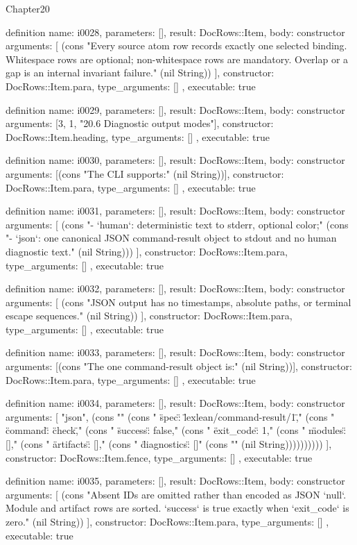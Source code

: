 \begin{lexlean}{Chapter20}
\begin{semanticmodule}
definition{
  name: i0028,
  parameters: [],
  result: DocRows::Item,
  body: constructor{
    arguments: [
      (cons "Every source atom row records exactly one selected binding. Whitespace rows are optional; non-whitespace rows are mandatory. Overlap or a gap is an internal invariant failure." (nil String))
    ],
    constructor: DocRows::Item.para,
    type_arguments: []
  },
  executable: true
}

definition{
  name: i0029,
  parameters: [],
  result: DocRows::Item,
  body: constructor{
    arguments: [3, 1, "20.6 Diagnostic output modes"],
    constructor: DocRows::Item.heading,
    type_arguments: []
  },
  executable: true
}

definition{
  name: i0030,
  parameters: [],
  result: DocRows::Item,
  body: constructor{
    arguments: [(cons "The CLI supports:" (nil String))],
    constructor: DocRows::Item.para,
    type_arguments: []
  },
  executable: true
}

definition{
  name: i0031,
  parameters: [],
  result: DocRows::Item,
  body: constructor{
    arguments: [
      (cons "- `human`: deterministic text to stderr, optional color;" (cons "- `json`: one canonical JSON command-result object to stdout and no human diagnostic text." (nil String)))
    ],
    constructor: DocRows::Item.para,
    type_arguments: []
  },
  executable: true
}

definition{
  name: i0032,
  parameters: [],
  result: DocRows::Item,
  body: constructor{
    arguments: [
      (cons "JSON output has no timestamps, absolute paths, or terminal escape sequences." (nil String))
    ],
    constructor: DocRows::Item.para,
    type_arguments: []
  },
  executable: true
}

definition{
  name: i0033,
  parameters: [],
  result: DocRows::Item,
  body: constructor{
    arguments: [(cons "The one command-result object is:" (nil String))],
    constructor: DocRows::Item.para,
    type_arguments: []
  },
  executable: true
}

definition{
  name: i0034,
  parameters: [],
  result: DocRows::Item,
  body: constructor{
    arguments: [
      "json",
      (cons "{" (cons "  \"spec\": \"lexlean/command-result/1\"," (cons "  \"command\": \"check\"," (cons "  \"success\": false," (cons "  \"exit_code\": 1," (cons "  \"modules\": []," (cons "  \"artifacts\": []," (cons "  \"diagnostics\": []" (cons "}" (nil String))))))))))
    ],
    constructor: DocRows::Item.fence,
    type_arguments: []
  },
  executable: true
}

definition{
  name: i0035,
  parameters: [],
  result: DocRows::Item,
  body: constructor{
    arguments: [
      (cons "Absent IDs are omitted rather than encoded as JSON `null`. Module and artifact rows are sorted. `success` is true exactly when `exit_code` is zero." (nil String))
    ],
    constructor: DocRows::Item.para,
    type_arguments: []
  },
  executable: true
}


\end{semanticmodule}
\end{lexlean}
